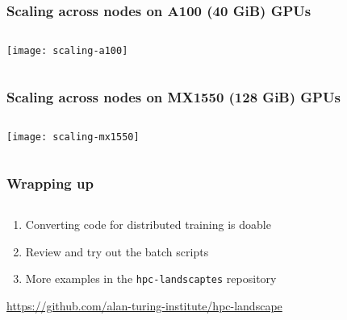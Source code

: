 \documentclass[
	notes=none,
	aspectratio=169
]{beamer}
\begin{document}

\begin{frame}
\frametitle{Scaling across nodes on A100 (40 GiB) GPUs}

\begin{columns}[T]
\begin{column}[T]{1.0\textwidth}
\setlength{\parskip}{0.5em}

\vspace{-1.5cm}
\texttt{[image: scaling-a100]}


\end{column}
\end{columns}

\end{frame}
\note{
}


\begin{frame}
\frametitle{Scaling across nodes on MX1550 (128 GiB) GPUs}

\begin{columns}[T]
\begin{column}[T]{1.0\textwidth}
\setlength{\parskip}{0.5em}

\vspace{-1.5cm}
\texttt{[image: scaling-mx1550]}


\end{column}
\end{columns}

\end{frame}
\note{
}


\begin{frame}
\frametitle{Wrapping up}

\begin{columns}[T]
\begin{column}[T]{1.0\textwidth}
\setlength{\parskip}{0.5em}

\vspace{0.0cm}
\begin{enumerate}
\setlength{\parskip}{0.5em}
\item Converting code for distributed training is doable
\item Review and try out the batch scripts
\item More examples in the {\tt hpc-landscaptes} repository
\end{enumerate}

\vspace{0.5cm}
\qquad \url{https://github.com/alan-turing-institute/hpc-landscape}

\end{column}
\end{columns}

\end{frame}
\note{
}


\end{document}
